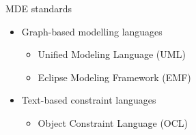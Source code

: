 \documentclass[dvips,slidetop,mathserif,brown]{beamer}
\begin{document}
\begin{frame}{MDE standards}
  \begin{itemize}
    \item Graph-based modelling languages
    \begin{itemize}
      \item Unified Modeling Language (UML)
      \item Eclipse Modeling Framework (EMF)
    \end{itemize}
    \item Text-based constraint languages
    \begin{itemize}
      \item Object Constraint Language (OCL)
    \end{itemize}
  \end{itemize}
\end{frame}

\end{document}
